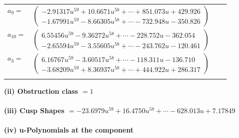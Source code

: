 \documentclass[1p]{elsarticle_modified}
\theoremstyle{definition}
\begin{document}
\begin{tabular}{m{7pt} m{180pt} m{7pt} m{180pt} }
\flushright $a_{9}=$&$\begin{pmatrix}-2.91317 u^{59}+10.6671 u^{58}+\cdots+851.073 u+429.926\\-1.67991 u^{59}-8.66305 u^{58}+\cdots-732.948 u-350.826\end{pmatrix}$ \\
\flushright $a_{10}=$&$\begin{pmatrix}6.55456 u^{59}-9.36272 u^{58}+\cdots-228.752 u-362.054\\-2.65594 u^{59}-3.55605 u^{58}+\cdots-243.762 u-120.461\end{pmatrix}$ \\
\flushright $a_{3}=$&$\begin{pmatrix}6.16767 u^{59}-3.60517 u^{58}+\cdots-118.311 u-136.710\\-3.68209 u^{59}+8.36937 u^{58}+\cdots+444.922 u+286.317\end{pmatrix}$\\&\end{tabular}
\flushleft \textbf{(ii) Obstruction class $= 1$}\\~\\
\flushleft \textbf{(iii) Cusp Shapes $= -23.6979 u^{59}+16.4750 u^{58}+\cdots-628.013 u+7.17849$}\\~\\
\newpage\renewcommand{\arraystretch}{1}
\flushleft \textbf{(iv) u-Polynomials at the component}\newline \\
\end{document}
